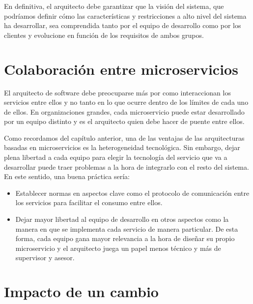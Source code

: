 \documentclass[11pt,a4paper]{article}
\begin{document}
En definitiva, el arquitecto debe garantizar que la visión del sistema, que podríamos definir cómo las características y restricciones a alto nivel del sistema ha desarrollar, sea comprendida tanto por el equipo de desarrollo como por los clientes y evolucione en función de los requisitos de ambos grupos.

\section{Colaboración entre microservicios}

El arquitecto de software debe preocuparse más por como interaccionan los servicios entre ellos y no tanto en lo que ocurre dentro de los límites de cada uno de ellos. En organizaciones grandes, cada microservicio puede estar desarrollado por un equipo distinto y es el arquitecto quien debe hacer de puente entre ellos.

Como recordamos del capítulo anterior, una de las ventajas de las arquitecturas basadas en microservicios es la heterogeneidad tecnológica.  Sin embargo, dejar plena libertad a cada equipo para elegir la tecnología del servicio que va a desarrollar puede traer problemas a la hora de integrarlo con el resto del sistema. En este sentido, una buena práctica sería:

\begin{itemize}

\item Establecer normas en aspectos clave como el protocolo de comunicación entre los servicios para facilitar el consumo entre ellos.

\item Dejar mayor libertad al equipo de desarrollo en otros aspectos como la manera en que se implementa cada servicio de manera particular. De esta forma, cada equipo gana mayor relevancia a la hora de diseñar su propio microservicio y el arquitecto juega un papel menos técnico y más de supervisor y asesor.

\end{itemize}

\section{Impacto de un cambio}
\end{document}
